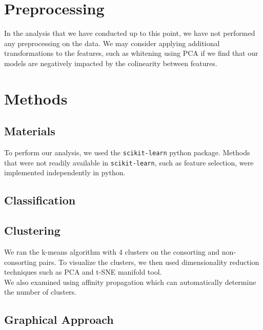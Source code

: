 \documentclass[twoside,twocolumn,paper=letter]{article}
\begin{document}
\section{Preprocessing}

In the analysis that we have conducted up to this point, we have not performed
any preprocessing on the data. We may consider applying additional
transformations to the features, such as whitening using PCA if we find that our
models are negatively impacted by the colinearity between features.

\section{Methods}
\subsection{Materials}

To perform our analysis, we used the \texttt{scikit-learn} python package. Methods
that were not readily available in \texttt{scikit-learn}, such as feature selection, were
implemented independently in python.


\subsection{Classification}
\subsection{Clustering}

We ran the k-means algorithm with 4 clusters on the consorting and
non-consorting pairs. To visualize the clusters, we then used dimensionality
reduction techniques such as PCA and t-SNE manifold tool.\\

We also examined using affinity propagation which can automatically determine
the number of clusters.

\subsection{Graphical Approach}
\end{document}
